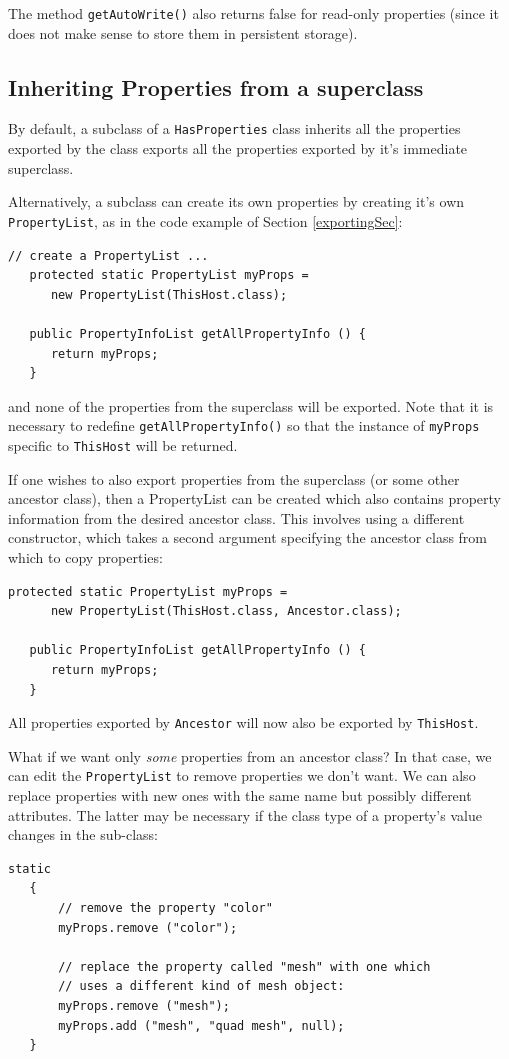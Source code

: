 The method {\tt getAutoWrite()} also returns false for read-only
properties (since it does not make sense to store them in persistent
storage).

\subsection{Inheriting Properties from a superclass}

By default, a subclass of a {\tt HasProperties} class inherits all the
properties exported by the class exports all the properties exported
by it's immediate superclass.

Alternatively, a subclass can create its own properties by creating
it's own {\tt PropertyList}, as in the code example of 
Section \ref{exportingSec}:
\begin{lstlisting}[]
   // create a PropertyList ...
   protected static PropertyList myProps = 
      new PropertyList(ThisHost.class);

   public PropertyInfoList getAllPropertyInfo () {
      return myProps;
   }
\end{lstlisting}
and none of the properties from the superclass will be exported.  Note
that it is necessary to redefine {\tt getAllPropertyInfo()} so that the
instance of {\tt myProps} specific to {\tt ThisHost} will be returned.

If one wishes to also export properties from the superclass (or some
other ancestor class), then a PropertyList can be created which also
contains property information from the desired ancestor class.  This
involves using a different constructor, which takes a second argument
specifying the ancestor class from which to copy properties:
\begin{lstlisting}[]
   protected static PropertyList myProps = 
      new PropertyList(ThisHost.class, Ancestor.class);

   public PropertyInfoList getAllPropertyInfo () {
      return myProps;
   }
\end{lstlisting}
All properties exported by {\tt Ancestor} will now also be
exported by {\tt ThisHost}.

What if we want only {\it some} properties from an ancestor class?
In that case, we can edit the {\tt PropertyList} to remove
properties we don't want. We can also replace properties with
new ones with the same name but possibly different attributes.
The latter may be necessary if the class type of a property's
value changes in the sub-class:
\begin{lstlisting}[]
   static
   {
       // remove the property "color"
       myProps.remove ("color"); 

       // replace the property called "mesh" with one which
       // uses a different kind of mesh object:
       myProps.remove ("mesh");
       myProps.add ("mesh", "quad mesh", null); 
   }
\end{lstlisting}

